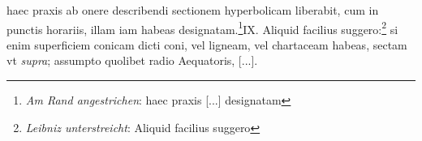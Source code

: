 \pend \pstart [p.~47] [...] haec praxis ab onere describendi sectionem hyperbolicam liberabit, cum in punctis horariis, illam iam habeas designatam.\footnote{\textit{Am Rand angestrichen}: haec praxis [...] designatam}\pend \pstart IX. Aliquid facilius suggero:\footnote{\textit{Leibniz unterstreicht}: Aliquid facilius suggero} si enim superficiem conicam dicti coni, vel ligneam, vel chartaceam habeas, sectam vt \textit{supra}; assumpto quolibet radio\protect{} Aequatoris\protect{}, [...].